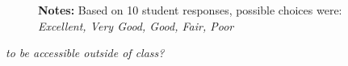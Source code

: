 \begin{boenumerate}
\begin{itemize}
\begin{figure}[h!]\centering
{}\hspace{0.75cm}
\begin{center}
\begin{minipage}[t]{0.85\columnwidth}\vspace{-0.75cm}
\item\scriptsize{\textbf{Notes:} Based on 10 student responses, possible choices were: \emph{Excellent, Very Good, Good, Fair, Poor} }
\end{minipage}
\end{center}
\end{figure}
\FloatBarrier
\newpage
\item \textit{to be accessible outside of class?}


\end{itemize}
\end{boenumerate}
